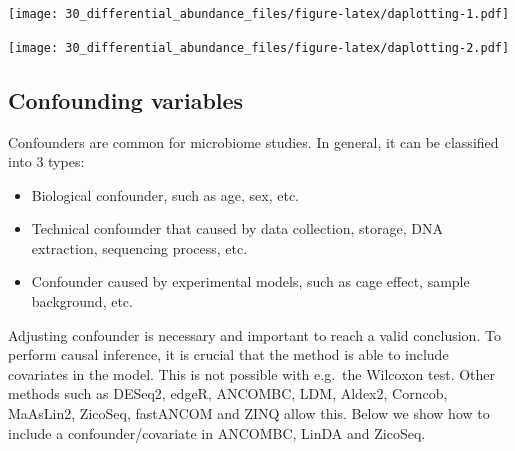 \documentclass[
]{book}
\newenvironment{Shaded}{\begin{snugshade}}{\end{snugshade}}
\newcommand{\AttributeTok}[1]{\textcolor[rgb]{0.77,0.63,0.00}{#1}}
\newcommand{\CommentTok}[1]{\textcolor[rgb]{0.56,0.35,0.01}{\textit{#1}}}
\newcommand{\DecValTok}[1]{\textcolor[rgb]{0.00,0.00,0.81}{#1}}
\newcommand{\FunctionTok}[1]{\textcolor[rgb]{0.00,0.00,0.00}{#1}}
\newcommand{\NormalTok}[1]{#1}
\newcommand{\OtherTok}[1]{\textcolor[rgb]{0.56,0.35,0.01}{#1}}
\newcommand{\SpecialCharTok}[1]{\textcolor[rgb]{0.00,0.00,0.00}{#1}}
\providecommand{\tightlist}{%
  \setlength{\itemsep}{0pt}\setlength{\parskip}{0pt}}
\begin{document}
\texttt{[image: 30\_differential\_abundance\_files/figure-latex/daplotting-1.pdf]}

\begin{Shaded}
\end{Shaded}

\texttt{[image: 30\_differential\_abundance\_files/figure-latex/daplotting-2.pdf]}

\hypertarget{confounding-variables}{%
\subsection{Confounding variables}\label{confounding-variables}}

Confounders are common for microbiome studies. In general, it can be classified into 3 types:

\begin{itemize}
\tightlist
\item
  Biological confounder, such as age, sex, etc.
\item
  Technical confounder that caused by data collection, storage, DNA extraction, sequencing process, etc.
\item
  Confounder caused by experimental models, such as cage effect, sample background, etc.
\end{itemize}

Adjusting confounder is necessary and important to reach a valid conclusion. To perform causal inference, it is crucial that the method is able to include covariates in the model. This is not possible with e.g.~the Wilcoxon test. Other methods such as DESeq2, edgeR, ANCOMBC, LDM, Aldex2, Corncob, MaAsLin2, ZicoSeq, fastANCOM and ZINQ allow this. Below we show how to include a confounder/covariate in ANCOMBC, LinDA and ZicoSeq.
\end{document}
